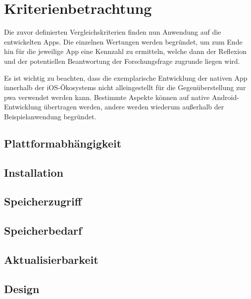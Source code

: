 \section{Kriterienbetrachtung}

Die zuvor definierten Vergleichskriterien finden nun Anwendung auf die entwickelten Apps. Die einzelnen Wertungen werden begründet, um zum Ende hin für die jeweilige App eine Kennzahl zu ermitteln, welche dann der Reflexion und der potentiellen Beantwortung der Forschungsfrage zugrunde liegen wird.

Es ist wichtig zu beachten, dass die exemplarische Entwicklung der nativen App innerhalb der iOS-Ökosystems nicht alleingestellt für die Gegenüberstellung zur \ac{pwa} verwendet werden kann. Bestimmte Aspekte können auf native Android-Entwicklung übertragen werden, andere werden wiederum außerhalb der Beispielanwendung begründet.

\subsection{Plattformabhängigkeit} \label{sec:6-plattform}


\subsection{Installation} \label{sec:6-installation}


\subsection{Speicherzugriff} \label{sec:6-speicherzugriff}


\subsection{Speicherbedarf} \label{sec:6-speicherbedarf}


\subsection{Aktualisierbarkeit} \label{sec:6-aktualisierbarkeit}


\subsection{Design} \label{sec:6-konsistenz-des-designs}


